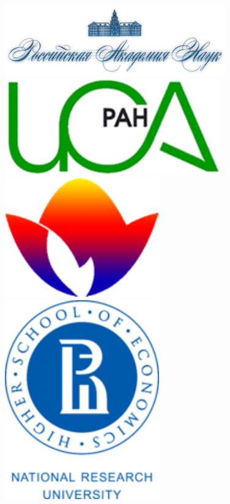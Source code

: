 \documentclass[default]{beamer}
\begin{document}
\begin{frame}
\begin{columns}
		\begin{column}{0.15\textwidth}
			\centering
			\includegraphics[width=\textwidth]{misc/logos/ras.png}
			\vspace{7pt}
			\includegraphics[width=0.7\textwidth]{misc/logos/isa.png}
			\vspace{7pt}
			\includegraphics[width=0.5\textwidth]{misc/logos/raai.png}
			\vspace{7pt}
			\includegraphics[width=0.5\textwidth]{misc/logos/hse.png}

\end{column}
\end{columns}
\end{frame}
\end{document}
